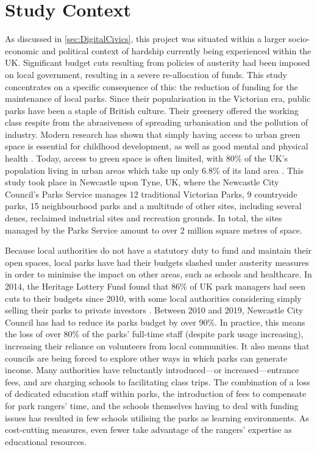 \section{Study Context}
\label{sec:ParkContext}
As discussed in \ref{sec:DigitalCivics}, this project was situated within a larger socio-economic and political context of hardship currently being experienced within the UK. Significant budget cuts resulting from policies of austerity had been imposed on local government, resulting in a severe re-allocation of funds. This study concentrates on a specific consequence of this: the reduction of funding for the maintenance of local parks. Since their popularisation in the Victorian era, public parks have been a staple of British culture. Their greenery offered the working class respite from the abrasiveness of spreading urbanisation and the pollution of industry. Modern research has shown that simply having access to urban green space is essential for childhood development, as well as good mental and physical health \citep{Fiennes2015}. Today, access to green space is often limited, with 80\% of the UK’s population living in urban areas which take up only 6.8\% of its land area \citep{UKNationalEcosystemAssesment2011}. This study took place in Newcastle upon Tyne, UK, where the Newcastle City Council's Parks Service manages 12 traditional Victorian Parks, 9 countryside parks, 15 neighbourhood parks and a multitude of other sites, including several denes, reclaimed industrial sites and recreation grounds. In total, the sites managed by the Parks Service amount to over 2 million square metres of space.

Because local authorities do not have a statutory duty to fund and maintain their open spaces, local parks have had their budgets slashed under austerity measures in order to minimise the impact on other areas, such as schools and healthcare. In 2014, the Heritage Lottery Fund found that 86\% of UK park managers had seen cuts to their budgets since 2010, with some local authorities considering simply selling their parks to private investors \citep{HeritageLotteryFund2014}. Between 2010 and 2019, Newcastle City Council has had to reduce its parks budget by over 90\%. In practice, this means the loss of over 80\% of the parks' full-time staff (despite park usage increasing), increasing their reliance on volunteers from local communities.  It also means that councils are being forced to explore other ways in which parks can generate income. Many authorities have reluctantly introduced---or increased---entrance fees, and are charging schools to facilitating class trips. The combination of a loss of dedicated education staff within parks, the introduction of fees to compensate for park rangers’ time, and the schools themselves having to deal with funding issues has resulted in few schools utilising the parks as learning environments. As cost-cutting measures, even fewer take advantage of the rangers’ expertise as educational resources.

